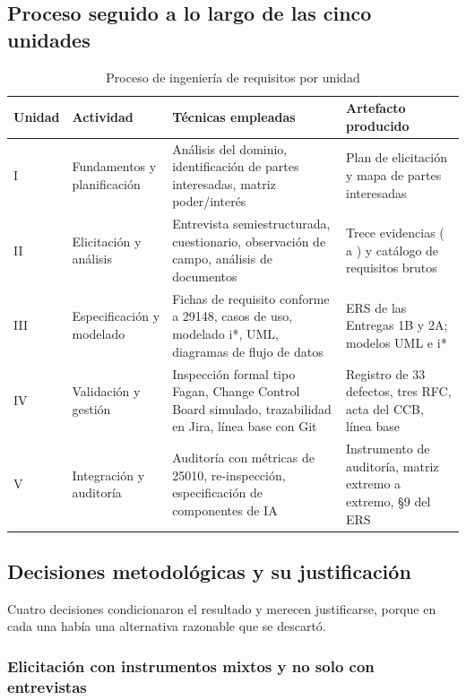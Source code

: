 \subsection{Proceso seguido a lo largo de las cinco unidades}

\begin{table}[H]
\centering\footnotesize
\caption{Proceso de ingeniería de requisitos por unidad}
\label{tab:proceso}
\begin{tabular}{|C{1.4cm}|L{4.0cm}|L{4.6cm}|L{4.6cm}|}
\hline
{}\textbf{Unidad} & \textbf{Actividad} & \textbf{Técnicas empleadas} & \textbf{Artefacto producido}\\ \hline
I & Fundamentos y planificación & Análisis del dominio, identificación de partes interesadas, matriz poder/interés & Plan de elicitación y mapa de partes interesadas\\ \hline
II & Elicitación y análisis & Entrevista semiestructurada, cuestionario, observación de campo, análisis de documentos & Trece evidencias ( a ) y catálogo de requisitos brutos\\ \hline
III & Especificación y modelado & Fichas de requisito conforme a 29148, casos de uso, modelado i*, UML, diagramas de flujo de datos & ERS de las Entregas 1B y 2A; modelos UML e i*\\ \hline
IV & Validación y gestión & Inspección formal tipo Fagan, Change Control Board simulado, trazabilidad en Jira, línea base con Git & Registro de 33 defectos, tres RFC, acta del CCB, línea base \\ \hline
V & Integración y auditoría & Auditoría con métricas de 25010, re-inspección, especificación de componentes de IA & Instrumento de auditoría, matriz extremo a extremo, \S9 del ERS\\ \hline
\end{tabular}
\end{table}

\subsection{Decisiones metodológicas y su justificación}

Cuatro decisiones condicionaron el resultado y merecen justificarse, porque en cada una había una
alternativa razonable que se descartó.

\subsubsection*{Elicitación con instrumentos mixtos y no solo con entrevistas}

